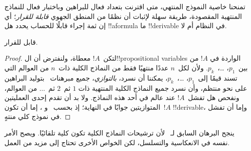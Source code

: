 \documentclass[../../../include/open-logic-section]{subfiles}
\begin{document}

تمنحنا خاصية النموذج المنتهي، متى اقترنت بتعداد فعال للبراهين وباختبار
فعال للنماذج المنتهية المقصودة، طريقة سهلة لإثبات أن نظمًا من المنطق
الجهوي \emph{قابلة للقرار}؛ أي إن ثمة إجراء قابلًا للحساب يحدد هل
!!a{formula} ما !!{derivable} في النظام أم لا.

\begin{thm}
   قابل للقرار.
\end{thm}

\begin{proof}
  لتكن~$!A$ معطاة، ولنفترض أن ال!!{propositional variable}s الواردة في
  $!A$ من بين~$p_1$، \dots،~$p_k$. ولأن لكل~$n$ عددًا منتهيًا فقط من
  النماذج الكلية ذات~$n$ من العوالم التي تسند قيمًا إلى~$p_1$،
  \dots،~$p_k$، يمكننا أن نسرد، \emph{بالتوازي}، جميع مبرهنات~
  بتوليد البراهين على نحو منتظم، وأن نسرد جميع النماذج الكلية المنتهية ذات
  $1$ ثم~$2$ ثم~$\dots$ من العوالم، ونفحص هل تفشل~$!A$ عند عالم في
  أحد هذه النماذج. ولا بد أن تقدم إحدى العمليتين المتوازيتين جوابًا في
  النهاية؛ إذ بحسب~ و
  ، إما أن تكون~$!A$ !!{derivable}، وإما أن تفشل
  في نموذج كلي منتهٍ.
\end{proof}

ينجح البرهان السابق لـ~ لأن ترشيحات النماذج الكلية تكون كلية
تلقائيًا. ويصح الأمر نفسه في الانعكاسية والتسلسل، لكن الخواص الأخرى تحتاج
إلى مزيد من العمل.
\end{document}
